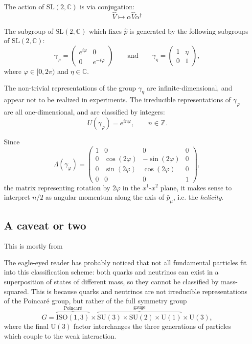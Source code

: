 \documentclass[a4paper]{report}
\newcommand{\C}{\mathbb{C}}
\newcommand{\Z}{\mathbb{Z}}
\newcommand{\SL}{\mathrm{SL}}
\theoremstyle{definition}
\theoremstyle{plain}
\theoremstyle{remark}
\begin{document}
The action of $\SL(2, \C)$ is via conjugation:
\begin{equation*}
  \hat{V} \mapsto \alpha \hat{V} \alpha^{\dagger}
\end{equation*}

The subgroup of $\SL(2, \C)$ which fixes $\hat{p}$ is generated by the following subgroups of $\SL(2, \C)$:
\begin{equation*}
  \gamma_{\varphi} = 
  \begin{pmatrix}
    e^{i \varphi} & 0 \\
    0 & e^{-i \varphi}
  \end{pmatrix}
  \qquad\text{and}\qquad \gamma_{\eta} = 
  \begin{pmatrix}
    1 & \eta \\
    0 & 1
  \end{pmatrix},
\end{equation*}
where $\varphi \in [0, 2\pi)$ and $\eta \in \C$.

The non-trivial representations of the group $\gamma_{\eta}$ are infinite-dimensional, and appear not to be realized in experiments. The irreducible representations of $\gamma_{\varphi}$ are all one-dimensional, and are classified by integers:
\begin{equation*}
  U(\gamma_{\varphi}) = e^{i n \varphi},\qquad n \in \Z.
\end{equation*}

Since
\begin{equation*}
  \Lambda(\gamma_{\varphi}) = 
  \begin{pmatrix}
    1 & 0 & 0 & 0 \\
    0 & \cos(2\varphi) & -\sin(2\varphi) & 0 \\
    0 & \sin(2\varphi) & \cos(2\varphi) & 0 \\
    0 & 0 & 0 & 1
  \end{pmatrix},
\end{equation*}
the matrix representing rotation by $2\varphi$ in the $x^{1}$-$x^{2}$ plane, it makes sense to interpret $n/2$ as angular momentum along the axis of $\bar{p}_{\mu}$, i.e. the \emph{helicity}.


\subsection{A caveat or two}
This is mostly from \cite{neumaier}

The eagle-eyed reader has probably noticed that not all fundamental particles fit into this classification scheme: both quarks and neutrinos can exist in a superposition of states of different mass, so they cannot be classified by mass-squared. This is because quarks and neutrinos are not irreducible representations of the Poincar\'{e} group, but rather of the full symmetry group
\begin{equation*}
  G = \overbrace{\mathrm{ISO}(1, 3)}^{\text{Poincar\'{e}}} \times \overbrace{\mathrm{SU}(3) \times \mathrm{SU}(2) \times \mathrm{U}(1)}^{\text{gauge}} \times \mathrm{U}(3),
\end{equation*}
where the final $\mathrm{U}(3)$ factor interchanges the three generations of particles which couple to the weak interaction.
\end{document}
